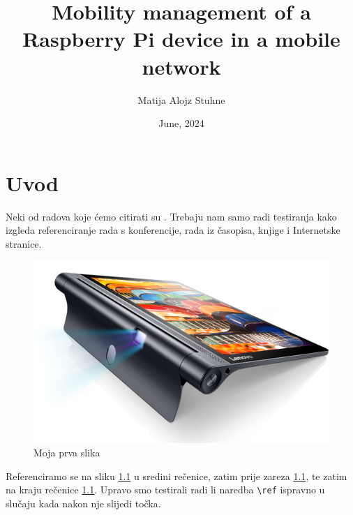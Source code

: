 \documentclass[zavrsnirad]{fer}
\title{Mobility management of a Raspberry Pi device in a mobile network}
\author{Matija Alojz Stuhne}
\date{June, 2024}
\begin{document}
\maketitle






\begin{zahvale}
\end{zahvale}


\mainmatter


\tableofcontents


\chapter{Uvod}
\label{pog:uvod}

Neki od radova koje ćemo citirati su \cite{6248073,6247753,ghiglia_pritt_phase_unwrapping,hartley2003multiple,4250461,123DCatch}.
Trebaju nam samo radi testiranja kako izgleda referenciranje rada s konferencije, rada iz časopisa, knjige i Internetske stranice.

\begin{figure}[htb]
  \centering
  \includegraphics[width=0.38\linewidth]{Figures/lenovo_yoga_tab3_pro_front.png} 
  \caption{Moja prva slika}
  \label{slk:prvaslika}
\end{figure}

Referenciramo se na sliku \ref{slk:prvaslika} u sredini rečenice, zatim prije zareza \ref{slk:prvaslika}, te zatim na kraju rečenice \ref{slk:prvaslika}.
Upravo smo testirali radi li naredba \verb|\ref| ispravno u slučaju kada nakon nje slijedi točka.
\end{document}
